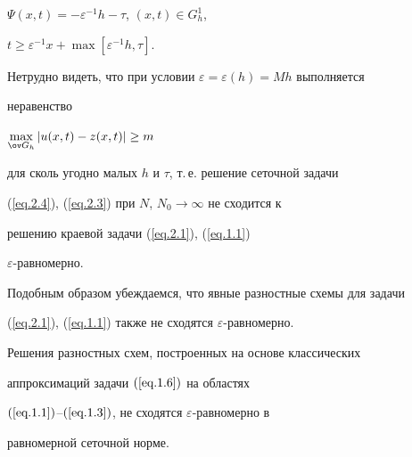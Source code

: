 $\Psi(x, t)=-\varepsilon^{-1} h-\tau$, $(x, t)\in G^1_h$,


$t\ge \varepsilon^{-1}x+\max [\varepsilon^{-1} h, \tau]$.





Нетрудно видеть, что при условии $\varepsilon=\varepsilon(h)=M h$ выполняется


неравенство


$\max\limits_{\ov G_h} |u(x, t)-z(x, t)|\ge m$


для сколь угодно малых $h$ и $\tau$, т.\,е. решение сеточной задачи


(\ref{eq.2.4}), (\ref{eq.2.3}) при $N$, $N_0\to \infty$ не сходится к


решению краевой задачи (\ref{eq.2.1}), (\ref{eq.1.1})


$\varepsilon$-равномерно.





Подобным образом убеждаемся, что явные разностные схемы для задачи


(\ref{eq.2.1}), (\ref{eq.1.1}) также не сходятся $\varepsilon$-равномерно.





\begin{thms} \label{t2.1}


Решения разностных схем, построенных на основе классических


аппроксимаций задачи $(\ref{eq.1.6})$ на областях


$(\ref{eq.1.1})$--$(\ref{eq.1.3})$, не сходятся $\varepsilon$-равномерно в


равномерной сеточной норме.


\end{thms}





